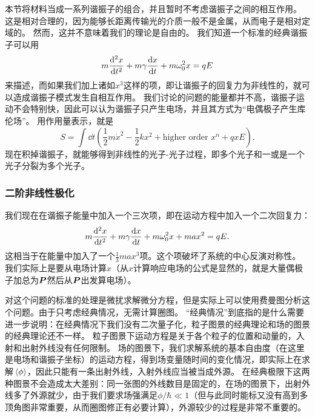\documentclass[UTF8, a4paper]{ctexart}
\begin{document}
本节将材料当成一系列谐振子的组合，并且暂时不考虑谐振子之间的相互作用。
这是相对合理的，因为能够长距离传输光的介质一般不是金属，从而电子是相对定域的。
然而，这并不意味着我们的理论是自由的。
我们知道一个标准的经典谐振子可以用
\begin{equation}
    m \dv[2]{x}{t} + m \gamma \dv{x}{t} + m \omega_0^2 x = q E
\end{equation}
来描述，而如果我们加上诸如$x^3$这样的项，即让谐振子的回复力为非线性的，就可以造成谐振子模式发生自相互作用。
我们讨论的问题的能量都并不高，谐振子运动不会特别快，因此可以认为谐振子只产生电场，并且其方式为“电偶极子产生库伦场”。
用作用量表示，就是%
\[
    S = \int \dd{t} \left( \frac{1}{2} m \dot{x}^2 - \frac{1}{2} k x^2 + \text{higher order $x^n$} + qxE \right).
\]
现在积掉谐振子，就能够得到非线性的光子-光子过程，即多个光子和一或是一个光子分裂为多个光子。

\subsubsection{二阶非线性极化}

我们现在在谐振子能量中加入一个三次项，即在运动方程中加入一个二次回复力：
\begin{equation}
    m \dv[2]{x}{t} + m \gamma \dv{x}{t} + m \omega_0^2 x + m a x^2 = q E.
    \label{eq:x3-eq}
\end{equation}
这相当于在能量中加入了一个$\frac{1}{3} m a x^3$项。这个项破坏了系统的中心反演对称性。
我们实际上是要从电场计算$x$（从$x$计算响应电场的公式是显然的，就是大量偶极子加总为$\vb*{P}$然后从$\vb*{P}$出发算电场）。

对这个问题的标准的处理是微扰求解微分方程，但是实际上可以使用费曼图分析这个问题。由于只考虑经典情况，无需计算圈图。
“经典情况”到底指的是什么需要进一步说明：在经典情况下我们没有二次量子化，粒子图景的经典理论和场的图景的经典理论还不一样。
粒子图景下运动方程是关于各个粒子的位置和动量的，入射和出射外线没有任何限制。
场的图景下，我们求解系统的基本自由度（在这里是电场和谐振子坐标）的运动方程，得到场变量随时间的变化情况，即实际上在求解$\expval*{\phi}$，因此只能有一条出射外线，入射外线应当被当成外源。
在经典极限下这两种图景不会造成太大差别：同一张图的外线数目是固定的，在场的图景下，出射外线多了外源就少，由于我们要求场强满足$\phi / \hbar \ll 1$（但与此同时能标又没有高到多顶角图非常重要，从而圈图修正有必要计算），外源较少的过程是非常不重要的。
\end{document}
